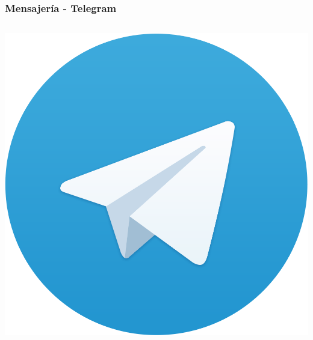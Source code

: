 \begin{frame}

    \frametitle{Mensajería - Telegram}

    \begin{columns}[c]
            \begin{center}
                \includegraphics[height=0.15\textheight]{images/telegram-logo.png}

\end{center}
\end{columns}
\end{frame}
